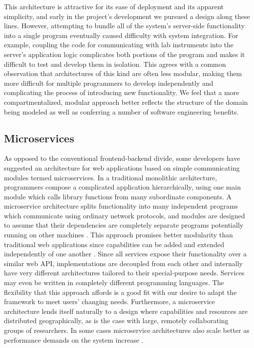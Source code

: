 \documentclass[../thesis]{subfiles}
\begin{document}
This architecture is attractive for its ease of deployment and its
apparent simplicity, and early in the project's development we pursued
a design along these lines. However, attempting to bundle all of the
system's server-side functionality into a single program eventually
caused difficulty with system integration. For example, coupling the
code for communicating with lab instruments into the server's
application logic complicates both portions of the program and makes
it difficult to test and develop them in isolation. This agrees with a
common observation \cite{Stephens:2015:BSE:2826034} that architectures
of this kind are often less modular, making them more difficult for
multiple programmers to develop independently and complicating the
process of introducing new functionality. We feel that a more
compartmentalized, modular approach better reflects the structure of
the domain being modeled as well as conferring a number of software
engineering benefits.

\subsection{Microservices}
As opposed to the conventional \gls{frontend}-\gls{backend} divide, some
developers have suggested an architecture for web applications based
on simple communicating modules termed \glspl{microservice}. In a
traditional monolithic architecture, programmers compose a complicated
application hierarchically, using one main module which calls library
functions from many subordinate components.  A microservice
architecture splits functionality into many independent programs which
communicate using ordinary network protocols, and modules are designed
to assume that their dependencies are completely separate programs
potentially running on other machines \cite{Micro14:online}.  This
approach promises better modularity than traditional web applications
since capabilities can be added and extended independently of one
another \cite{Balalaie2016}. Since all services expose their
functionality over a similar web \gls{API}, implementations are
decoupled from each other and internally have very different
architectures tailored to their special-purpose needs.  Services may
even be written in completely different programming languages. The
flexibility that this approach affords is a good fit with our desire
to adapt the framework to meet users' changing needs. Furthermore, a
microservice architecture lends itself naturally to a design where
capabilities and resources are distributed geographically, as is the
case with large, remotely collaborating groups of researchers. In some
cases microservice architectures also scale better as performance
demands on the system increase \cite{}.
\end{document}

